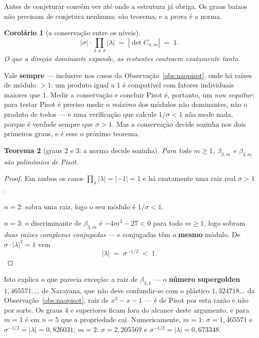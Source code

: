 \documentclass[11pt,a4paper]{article}
\theoremstyle{plain}
\newtheorem{teorema}{Teorema}[section]
\newtheorem{corolario}[teorema]{Corolário}
\theoremstyle{definition}
\theoremstyle{remark}
\providecommand{\Comp}[2]{C_{#1,#2}}
\begin{document}
Antes de conjeturar convém ver até onde a estrutura já obriga. Os graus baixos não precisam de
conjetura nenhuma: são teorema, e a prova é a norma.

\begin{corolario}[a conservação entre os níveis]\label{cor:conserva}
\[
  |\sigma| \cdot \!\!\prod_{\lambda \neq \sigma}\!\! |\lambda| \;=\; |\det \Comp{n}{m}| \;=\; 1 .
\]
\emph{O que a direção dominante expande, as restantes contraem exatamente tanto.}
\end{corolario}

\noindent Vale \textbf{sempre} --- inclusive nos casos da Observação~\ref{obs:naopisot}, onde há
raízes de módulo $>1$: um produto igual a $1$ é compatível com fatores individuais maiores que $1$.
Medir a conservação e concluir Pisot é, portanto, um \emph{non sequitur}: para testar Pisot é
preciso medir o \emph{máximo} dos módulos não dominantes, não o produto de todos --- e uma
verificação que calcule $1/\sigma<1$ não mede nada, porque é verdade sempre que $\sigma>1$. Mas a
conservação decide sozinha nos dois primeiros graus, e é esse o próximo teorema.

\begin{teorema}[graus $2$ e $3$: a norma decide sozinha]\label{thm:graus23}
Para todo $m\geq1$, $\beta_{2,m}$ e $\beta_{3,m}$ são polinómios de Pisot.
\end{teorema}

\begin{proof}
Em ambos os casos $\prod_\lambda|\lambda| = |{-1}| = 1$ e há exatamente uma raiz real $\sigma>1$.

$n=2$: sobra uma raiz, logo o seu módulo é $1/\sigma < 1$.

$n=3$: o discriminante de $\beta_{3,m}$ é $-4m^3-27<0$ para todo $m\geq1$, logo sobram
\emph{duas raízes complexas conjugadas} --- e conjugadas têm o \textbf{mesmo} módulo. De
$\sigma\cdot|\lambda|^2 = 1$ vem
\[
  |\lambda| \;=\; \sigma^{-1/2} \;<\; 1 .
\]
\end{proof}

\noindent Isto explica o que parecia exceção: a raiz de $\beta_{3,1}$ --- o \textbf{número
supergolden} $1{,}465571\ldots$, de Narayana, que não deve confundir-se com o plástico
$1{,}324718\ldots$ da Observação~\ref{obs:naopisot}, raiz de $x^3-x-1$ --- é de Pisot por esta
razão e não por sorte. Os graus $4$ e superiores ficam fora do alcance deste argumento, e para
$m=1$ é em $n=5$ que a propriedade cai.
Numericamente, $m=1$: $\sigma=1{,}465571$ e $\sigma^{-1/2}=|\lambda|=0{,}826031$;
$m=2$: $\sigma=2{,}205569$ e $\sigma^{-1/2}=|\lambda|=0{,}673348$.
\end{document}
